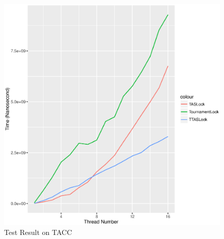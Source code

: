 \documentclass[a4paper]{report}
\begin{document}
\begin{figure}[H]
  \includegraphics[scale=0.8]{result-tacc-7637283}
  \caption{Test Result on TACC}
\end{figure}
\end{document}
